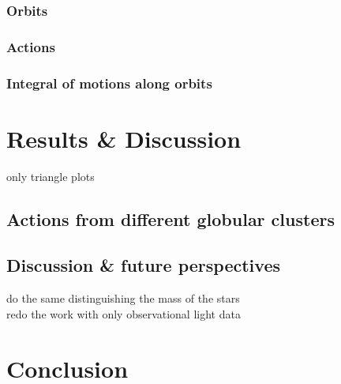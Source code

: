 \documentclass[a4paper,12pt,abstracton]{scrartcl}
\begin{document}
\subsubsection{Orbits}
\subsubsection{Actions}
\subsubsection{Integral of motions along orbits}
\newpage
\section{Results \& Discussion}
only triangle plots

\subsection{Actions from different globular clusters}
\subsection{Discussion \& future perspectives}
do the same distinguishing the mass of the stars\\
redo the work with only observational light data
\newpage
\section{Conclusion}
\end{document}
